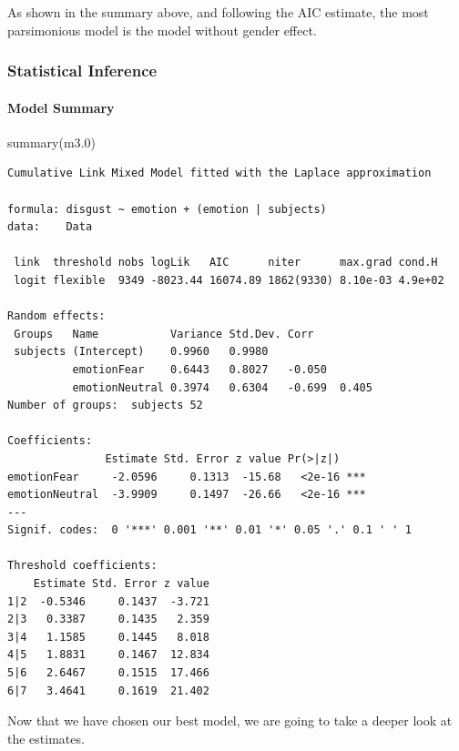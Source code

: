\documentclass[
]{article}
\newenvironment{Shaded}{\begin{snugshade}}{\end{snugshade}}
\newcommand{\FloatTok}[1]{\textcolor[rgb]{0.00,0.00,0.81}{#1}}
\newcommand{\FunctionTok}[1]{\textcolor[rgb]{0.00,0.00,0.00}{#1}}
\newcommand{\NormalTok}[1]{#1}
\begin{document}
As shown in the summary above, and following the AIC estimate, the most
parsimonious model is the model without gender effect.

\hypertarget{statistical-inference}{%
\subsubsection{Statistical Inference}\label{statistical-inference}}

\hypertarget{model-summary}{%
\paragraph{Model Summary}\label{model-summary}}

\begin{Shaded}
\begin{Highlighting}[]
\FunctionTok{summary}\NormalTok{(m3}\FloatTok{.0}\NormalTok{)}
\end{Highlighting}
\end{Shaded}

\begin{verbatim}
Cumulative Link Mixed Model fitted with the Laplace approximation

formula: disgust ~ emotion + (emotion | subjects)
data:    Data

 link  threshold nobs logLik   AIC      niter      max.grad cond.H 
 logit flexible  9349 -8023.44 16074.89 1862(9330) 8.10e-03 4.9e+02

Random effects:
 Groups   Name           Variance Std.Dev. Corr          
 subjects (Intercept)    0.9960   0.9980                 
          emotionFear    0.6443   0.8027   -0.050        
          emotionNeutral 0.3974   0.6304   -0.699  0.405 
Number of groups:  subjects 52 

Coefficients:
               Estimate Std. Error z value Pr(>|z|)    
emotionFear     -2.0596     0.1313  -15.68   <2e-16 ***
emotionNeutral  -3.9909     0.1497  -26.66   <2e-16 ***
---
Signif. codes:  0 '***' 0.001 '**' 0.01 '*' 0.05 '.' 0.1 ' ' 1

Threshold coefficients:
    Estimate Std. Error z value
1|2  -0.5346     0.1437  -3.721
2|3   0.3387     0.1435   2.359
3|4   1.1585     0.1445   8.018
4|5   1.8831     0.1467  12.834
5|6   2.6467     0.1515  17.466
6|7   3.4641     0.1619  21.402
\end{verbatim}

Now that we have chosen our best model, we are going to take a deeper
look at the estimates.\\
\end{document}
